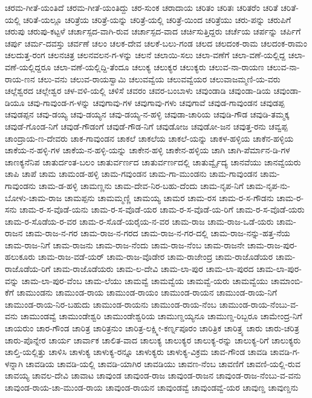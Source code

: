 ಚರಮ-ಗೀತೆ-ಯಂತಿದೆ
ಚರಮ-ಗೀತೆ-ಯಂತಿದ್ದು
ಚರ-ಸುಂಕ
ಚರಾದಾಯ
ಚರಿತಂ
ಚರಿತಃ
ಚರಿತರೆಂ
ಚರಿತೆ
ಚರಿತೆ-ಯಲ್ಲಿ
ಚರಿತೆ-ಯಲ್ಲೂ
ಚರಿತ್ರೆಯ
ಚರಿತ್ರೆ-ಯನ್ನು
ಚರಿತ್ರೆ-ಯಲ್ಲಿ
ಚರಿತ್ರೆ-ಯಿಂದ
ಚರಿತ್ರೆಯು
ಚರು-ಪನ್ನು
ಚರುಪಿಗೆ
ಚರುಪು
ಚರುಪು-ಕಟ್ಟಳೆ
ಚರ್ಚಾಸ್ಪದ-ವಾಗಿ-ರುವ
ಚರ್ಚಾಸ್ಪದ-ವಾದ
ಚರ್ಚಿಸುತ್ತಿದ್ದರು
ಚರ್ಚೆಯ
ಚರ್ಪನ್ನು
ಚರ್ಪಿಗೆ
ಚರ್ಪು
ಚರ್ಮ-ದವಸ್ತು
ಚರ್ವಣೆ
ಚಲಂ
ಚಲಕ-ದೇವ
ಚಲಕೆ-ಬಲು-ಗಂಡ
ಚಲದ
ಚಲದಂಕ-ರಾಮ
ಚಲದಂಕ-ರಾಮಂ
ಚಲದುತ್ತ-ರಂಗ
ಚಲನಚಿತ್ರ
ಚಲನವಲನ-ಗ-ಳನ್ನು
ಚಲನೆ
ಚಲಾಯಿ-ಸಲು
ಚಲಾ-ವಣೆಗೆ
ಚಲಾ-ವಣೆ-ಯಲ್ಲಿದ್ದ
ಚಲಾ-ವಣೆ-ಯಲ್ಲಿದ್ದರೂ
ಚಲಾ-ವಣೆ-ಯಲ್ಲಿದ್ದಿ-ತೆಂದೂ
ಚಲುಕ್ಯ
ಚಲುಕ್ಯರ
ಚಲುಕ್ಯರು
ಚಲುವ-ನಾ-ರಾಯಣ
ಚಲುವ-ನಾ-ರಾಯ-ಣನ
ಚಲು-ವನು
ಚಲುವ-ರಾಯಸ್ವಾಮಿ
ಚಲುವವ್ವೆಯ
ಚಲುವವ್ವೆಯರ
ಚಲುವಾಜಮ್ಮಣಿ-ಯ-ವರು
ಚಲ್ಲೆಶ್ವರದ
ಚಲ್ಲೇಶ್ವರ
ಚಳ-ವಳಿ-ಯಲ್ಲಿ
ಚಳಿಸೆ
ಚವರಂ
ಚವರ-ಬಂಬಾಳು
ಚವುಂಡಾಡಿ
ಚವುಂಡಾ-ಡಿಯ
ಚವುಂಡಾ-ಡಿಯೂ
ಚವು-ಗಾವುಂಡ-ಗ-ಳನ್ನು
ಚವುಗಾವು-ಗಳ
ಚವುಗಾವು-ಗಳು
ಚವುಗಾವೆ
ಚವುಡ-ಗಾವುಂಡನ
ಚವುಡಪ್ಪ
ಚವುಡಪ್ಪನ
ಚವು-ಡಯ್ಯ
ಚವು-ಡಯ್ಯನ
ಚವು-ಡಯ್ಯ-ನ-ಹಳ್ಳಿ
ಚವುಡಾ-ಚಾರಿಯ
ಚವುಡಿ-ಗೌಡ
ಚವುಡಿ-ತಮ್ಮಕ್ಕ
ಚವುಡೆ-ಗೊಂಡ-ನಿಗೆ
ಚವುಡೆ-ಗೌಡಂಗೆ
ಚವುಡೆ-ಗೌಡ-ನಿಗೆ
ಚವುಡೋಜ
ಚವುಡೋ-ಜನ
ಚವುತ್ತ-ರನು
ಚವ್ವಪ್ಪ
ಚಾಂದ್ರಾಯ-ಣ-ದೇವರು
ಚಾಕ-ಗಾವುಂಡನ
ಚಾಕಲೆ
ಚಾಕಲೆಯ
ಚಾಕಲೆ-ಯನ್ನು
ಚಾಕಳ-ಹಳ್ಳಿಯ
ಚಾಕೆನ-ಹಳ್ಳಿಯ
ಚಾಕೆಯ-ನ-ಹಳ್ಳಿ-ಗಳ
ಚಾಕೆಯ-ನ-ಹಳ್ಳಿ-ಯನ್ನು
ಚಾಕೇನ-ಹಳ್ಳಿ
ಚಾಕೇನ-ಹಳ್ಳಿಯ
ಚಾಗಿ
ಚಾಗಿ-ಪೆರ್ಮಾನ-ಡಿ-ಗಳ
ಚಾಣಕ್ಯನೆನಿಪ
ಚಾತುರ್ದಂತ-ಬಲಂ
ಚಾತುರ್ವರ್ಣದ
ಚಾತುರ್ವರ್ಣದಲ್ಲಿ
ಚಾತುರ್ವ್ವೈದ್ಯ
ಚಾನವೆಯು
ಚಾನವ್ವೆಯರು
ಚಾಪಿ
ಚಾಪೆ
ಚಾಮ
ಚಾಮಂಡ-ಹಳ್ಳಿ
ಚಾಮ-ಗವುಂಡನ
ಚಾಮ-ಗಾ-ಮುಂಡನು
ಚಾಮ-ಗಾವುಂಡನ
ಚಾಮ-ಗಾವುಂಡನು
ಚಾಮ-ಡ-ಹಳ್ಳಿ
ಚಾಮಣ್ಣನು
ಚಾಮ-ದೇವ-ನಿರ-ಬಹು-ದೆಂದು
ಚಾಮ-ನೃಪ-ನಿಗೆ
ಚಾಮ-ನೃಪ-ನು-ಬೋಳು-ಚಾಮ-ರಾಜ
ಚಾಮಪ್ಪನು
ಚಾಮಮ್ಮಣ್ಣಿ
ಚಾಮಯ್ಯ
ಚಾಮರ
ಚಾಮ-ರಸ
ಚಾಮ-ರ-ಸ-ಗೌಡನು
ಚಾಮ-ರ-ಸನು
ಚಾಮ-ರ-ಸ-ವೊಡೆ-ಯನು
ಚಾಮ-ರ-ಸ-ವೊಡೆ-ಯರ
ಚಾಮ-ರ-ಸ-ವೊಡೆ-ಯ-ರಿಗೆ
ಚಾಮ-ರ-ಸ-ವೊಡೆ-ಯರು
ಚಾಮ-ರ-ಸೊಡೆಯ-ರ-ವರ
ಚಾಮ-ರ-ಸೊಡೆ-ಯರೈಯ-ನ-ವರ
ಚಾಮ-ರಾಜ
ಚಾಮ-ರಾಜ-ಒಡೆ-ಯರು
ಚಾಮ-ರಾಜನ
ಚಾಮ-ರಾಜ-ನ-ಗರ
ಚಾಮ-ರಾಜ-ನ-ಗರದ
ಚಾಮ-ರಾಜ-ನ-ಗರ-ದಲ್ಲಿ
ಚಾಮ-ರಾಜ-ನನ್ನು-ಹತ್ತ-ನೆಯ
ಚಾಮ-ರಾಜ-ನಿಗೆ
ಚಾಮ-ರಾಜನು
ಚಾಮ-ರಾಜ-ನೆಂದು
ಚಾಮ-ರಾಜ-ನೆಂಬ
ಚಾಮ-ರಾಜನೇ
ಚಾಮ-ರಾಜ-ಪುರ-ಹಲುಕೂರು
ಚಾಮ-ರಾಜ-ವಡೆ-ಯರ್
ಚಾಮ-ರಾಜ-ವೊಡೇರ
ಚಾಮ-ರಾಜೇಂದ್ರ
ಚಾಮ-ರಾಜೊಡೆಯರ
ಚಾಮ-ರಾಜೊಡೆಯ-ರಿಗೆ
ಚಾಮ-ರಾಜೊಡೆಯರು
ಚಾಮ-ಲ-ದೇವಿ
ಚಾಮ-ಲಾ-ಪುರ
ಚಾಮ-ಲಾ-ಪುರದ
ಚಾಮ-ಲಾ-ಪುರ-ವನ್ನು
ಚಾಮ-ಲಾ-ಪುರ-ವೆಂಬ
ಚಾಮ-ಲೆಯು
ಚಾಮವ್ವೆ
ಚಾಮವ್ವೆಯ
ಚಾಮವ್ವೆ-ಯರು
ಚಾಮವ್ವೆಯು
ಚಾಮಾಂಬಿ-ಕೆಗೆ
ಚಾಮುಂಡನು
ಚಾಮುಂಡ-ರಾಯ
ಚಾಮುಂಡ-ರಾಯಂ
ಚಾಮುಂಡ-ರಾಯನ
ಚಾಮುಂಡ-ರಾಯ-ನಿಗೆ
ಚಾಮುಂಡ-ರಾಯ-ನಿರ-ಬಹುದು
ಚಾಮುಂಡ-ರಾಯನು
ಚಾಮುಂಡ-ರಾಯ-ನೆಂಬ
ಚಾಮುಂಡ-ರಾಯ-ನೆಂಬು-ವ-ವನು
ಚಾಮುಂಡವ್ವೆ
ಚಾಮುಂಡೇಶ್ವರಿ
ಚಾಮುಂಡೇಶ್ವರಿಯ
ಚಾಮುಣ್ಡಯ್ಯನೂ
ಚಾಮುಣ್ಡ-ರಿಬ್ಬರೂ
ಚಾಮೇಂದ್ರ-ನಿಗೆ
ಚಾಯರುಂ
ಚಾರ-ಗೌಂಡ
ಚಾರಿತ್ರ
ಚಾರಿತ್ರನುಂ
ಚಾರಿತ್ರ-ಲಕ್ಷ್ಮೀ-ಕರ್ಣ್ನಪೂರಂ
ಚಾರಿತ್ರಿಕ
ಚಾರಿತ್ರ್ಯ
ಚಾರು
ಚಾರು-ಚರಿತ್ರ
ಚಾರು-ಪೊನ್ನೇರ
ಚಾರ್ಯ
ಚಾರ್ವಾಕ
ಚಾಲಿತ-ವಾದ
ಚಾಲುಕ್ಯ
ಚಾಲುಕ್ಯರ
ಚಾಲುಕ್ಯ-ರನ್ನು
ಚಾಲುಕ್ಯ-ರಿಗೆ
ಚಾಲುಕ್ಯರು
ಚಾಲ್ತಿ-ಯಲ್ಲಿತ್ತು
ಚಾಳಿಸಿ
ಚಾಳುಕ್ಯ
ಚಾಳುಕ್ಯ-ರನ್ನೂ
ಚಾಳುಕ್ಯರು
ಚಾಳುಕ್ಯ-ವಿಕ್ರಮ
ಚಾವ-ಗೌಂಡ
ಚಾವಡಿ
ಚಾವಡಿ-ಗ-ಳನ್ನಾಗಿ
ಚಾವಡಿಯ
ಚಾವಡಿ-ಯಲ್ಲಿ
ಚಾವಡಿ-ಯಾಗಿರ
ಚಾವಡಿಯು
ಚಾವಣ-ನೆಂಬ
ಚಾವಣಿಗೆ
ಚಾವಣಿ-ಯಲ್ಲಿ-ರುವ
ಚಾವಯ್ಯ
ಚಾವಲ-ದೇವಿ
ಚಾವಾಟ
ಚಾವುಂಡ
ಚಾವುಂಡ-ರಾಜ
ಚಾವುಂಡ-ರಾಜನ
ಚಾವುಂಡ-ರಾಜ-ನೆಂಬು-ವ-ವನು
ಚಾವುಂಡ-ರಾಯ-ಚಾ-ಮುಂಡ-ರಾಯ
ಚಾವುಂಡ-ರಾಯನ
ಚಾವುಂಡವ್ವೆ
ಚಾವುಂಡವ್ವೆ-ಯರ
ಚಾವುಣ್ಡ
ಚಾವುಣ್ಡನು
